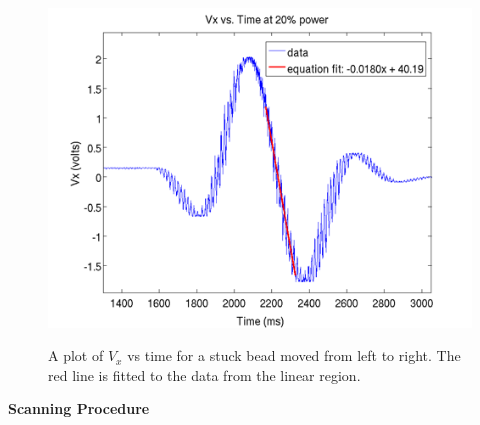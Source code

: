 \documentclass{../lab}
\begin{document}
\begin{figure}[h]
    \centering
    \href{http://experimentationlab.berkeley.edu/sites/default/files/images/StuckBead500.png}{\includegraphics[width=0.7\linewidth]{images/StuckBead500.png}}
    \caption{A plot of $V_x$ vs time for a stuck bead moved from left to right. The red line is fitted to the data from the linear region.}
    \label{fig:StuckBead500}
\end{figure}

\textbf{Scanning Procedure}
\end{document}

